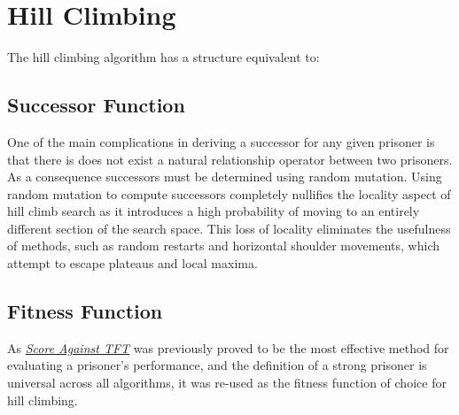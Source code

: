 \documentclass[12pt]{article}
\begin{document}
\section{Hill Climbing}

The hill climbing algorithm has a structure equivalent to: \\

\begin{algorithm}[H]
\end{algorithm}

\subsection {Successor Function}

One of the main complications in deriving a successor for any given prisoner
is that there is does not exist a natural relationship operator between two prisoners.
As a consequence successors must be determined using random mutation.  Using
random mutation to compute successors completely nullifies the locality aspect
of hill climb search as it introduces a high probability of moving to an entirely different
section of the search space.  This loss of locality eliminates the usefulness of
methods, such as random restarts and horizontal shoulder movements, which attempt to
escape plateaus and local maxima.

\subsection {Fitness Function}

As \textit{\hyperref[tft]{Score Against TFT}} was previously proved to be the most
effective method for evaluating a prisoner's performance, and the definition
of a strong prisoner is universal across all algorithms, it was re-used as the fitness
function of choice for hill climbing.

\pagebreak
\end{document}
